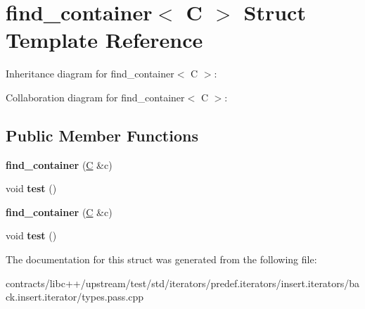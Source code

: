 \hypertarget{structfind__container}{}\section{find\+\_\+container$<$ C $>$ Struct Template Reference}
\label{structfind__container}


Inheritance diagram for find\+\_\+container$<$ C $>$\+:


Collaboration diagram for find\+\_\+container$<$ C $>$\+:
\subsection*{Public Member Functions}
\begin{DoxyCompactItemize}
\item 
\mbox{\label{structfind__container_a3c3a778a2e0dc82be4f35c03c240231d}} 
{\bfseries find\+\_\+container} (\mbox{\hyperlink{struct_c}{C}} \&c)
\item 
\mbox{\label{structfind__container_a90aecf74b6125908f2bb9fb1c0cd9a9a}} 
void {\bfseries test} ()
\item 
\mbox{\label{structfind__container_a3c3a778a2e0dc82be4f35c03c240231d}} 
{\bfseries find\+\_\+container} (\mbox{\hyperlink{struct_c}{C}} \&c)
\item 
\mbox{\label{structfind__container_a90aecf74b6125908f2bb9fb1c0cd9a9a}} 
void {\bfseries test} ()
\end{DoxyCompactItemize}


The documentation for this struct was generated from the following file\+:\begin{DoxyCompactItemize}
\item 
contracts/libc++/upstream/test/std/iterators/predef.\+iterators/insert.\+iterators/back.\+insert.\+iterator/types.\+pass.\+cpp\end{DoxyCompactItemize}
